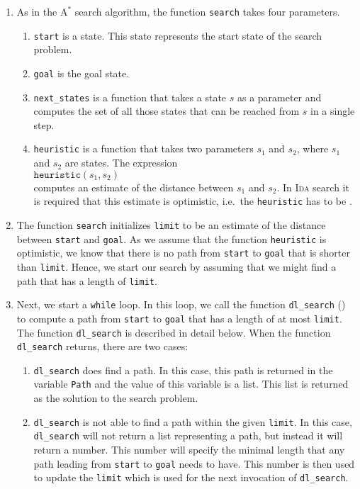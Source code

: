 \begin{enumerate}
\item As in the $\mathrm{A}^*$ search algorithm, the function \texttt{search} takes four parameters.
      \begin{enumerate}
      \item \texttt{start} is a state.  This state represents the start state of the search problem.
      \item \texttt{goal} is the goal state.
      \item \texttt{next\_states} is a function that takes a state $s$ as a parameter and
            computes the set of all those states that can be reached from $s$ in a single step.
      \item \texttt{heuristic} is a function that takes two parameters $s_1$ and $s_2$, where $s_1$ and $s_2$
            are states. The expression
            \\[0.2cm]
            \hspace*{1.3cm}
            $\texttt{heuristic}(s_1, s_2)$
            \\[0.2cm]
            computes an estimate of the distance between $s_1$ and $s_2$.  In \textsc{Ida} search it is required that this
            estimate is optimistic, i.e.~the \texttt{heuristic} has to be .
     \end{enumerate}
\item The function \texttt{search} initializes \texttt{limit} to be an estimate of the distance
      between \texttt{start} and \texttt{goal}.  As we assume that the function \texttt{heuristic} is
      optimistic, we know that there is no path from \texttt{start} to \texttt{goal} that is shorter than
      \texttt{limit}.  Hence, we start our search by assuming that we might find a path that has a length of
      \texttt{limit}.
\item Next, we start a \texttt{while} loop.  In this loop, we call the function \texttt{dl\_search} 
      () to compute a path from
      \texttt{start} to \texttt{goal} that has a length of at most \texttt{limit}.  The function
      \texttt{dl\_search}  is described in detail below.
      When the function \texttt{dl\_search} returns, there are two cases:
      \begin{enumerate}
      \item \texttt{dl\_search} does find a path.  In this case, this path is returned in the variable
            \texttt{Path} and the value of this variable is a list.  This list is returned as the solution to
            the search problem.
      \item \texttt{dl\_search} is not able to find a path within the given \texttt{limit}.  In this case,
            \texttt{dl\_search} will not return a list representing a path, but instead it will return a number.
            This number will specify the minimal length that any path leading from \texttt{start} to \texttt{goal} needs to
            have.  This number is then used to update the \texttt{limit} which is used for the next
            invocation of \texttt{dl\_search}.


\end{enumerate}
\end{enumerate}
